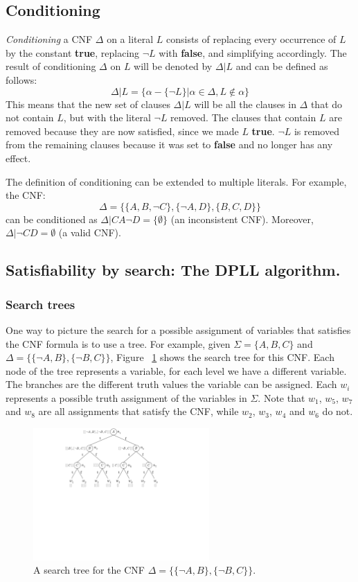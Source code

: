 \documentclass[12pt]{diicc}
\begin{document}
\subsection{Conditioning}
\textit{Conditioning} a CNF $\Delta$ on a literal $L$ consists of replacing every occurrence of $L$ by the constant \textbf{true}, replacing $\neg L$ with \textbf{false}, and simplifying accordingly. The result of conditioning $\Delta$ on $L$ will be denoted by $\Delta |L$ and can be defined as follows:
\[ \Delta |L=\{\alpha -\{\neg L\}|\alpha \in \Delta, L\notin \alpha\}\]
This means that the new set of clauses $\Delta |L$ will be all the clauses in $\Delta$ that do not contain $L$, but with the literal $\neg L$ removed. The clauses that contain $L$ are removed because they are now satisfied, since we made $L$ \textbf{true}. $\neg L$ is removed from the remaining clauses because it was set to \textbf{false} and no longer has any effect.

The definition of conditioning can be extended to multiple literals. For example, the CNF:
\[\Delta=\{\{A,B,\neg C\},\{\neg A,D\},\{B,C,D\}\}\]
can be conditioned as $\Delta |CA\neg D=\{\emptyset \}$ (an inconsistent CNF). Moreover, $\Delta |\neg CD=\emptyset$ (a valid CNF).

\subsection{Satisfiability by search: The DPLL algorithm.}

\subsubsection{Search trees}
One way to picture the search for a possible assignment of variables that satisfies the CNF formula is to use a tree. For example, given $\Sigma =\{A,B,C\}$ and $\Delta =\{\{\neg A,B\},\{\neg B,C\}\}$, Figure ~\ref{fig:searchtree} shows the search tree for this CNF. Each node of the tree represents a variable, for each level we have a different variable. The branches are the different truth values the variable can be assigned. Each $w_{i}$ represents a possible truth assignment of the variables in $\Sigma$. Note that $w_{1}$, $w_{5}$, $w_{7}$ and $w_{8}$ are all assignments that satisfy the CNF, while $w_{2}$, $w_{3}$, $w_{4}$ and $w_{6}$ do not.

\begin{figure}[h!]
	\centering
		\includegraphics[width=0.6\textwidth]{search_tree}
	\caption{A search tree for the CNF $\Delta =\{\{\neg A,B\},\{\neg B,C\}\}$.}
	\label{fig:searchtree}
\end{figure}
\end{document}

